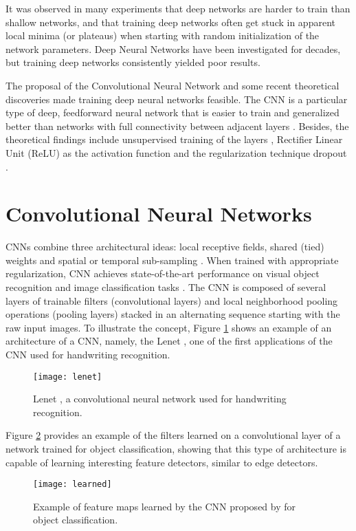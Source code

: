 It was observed in many experiments that deep networks are harder to train than shallow networks, and that training deep networks often get stuck in apparent local minima (or plateaus) when starting with random initialization of the network parameters. Deep Neural Networks have been investigated for decades, but training deep networks consistently yielded poor results. 

The proposal of the Convolutional Neural Network \cite{lecun1995convolutional} and some recent theoretical discoveries made training deep neural networks feasible. The CNN is a particular type of deep, feedforward neural network that is easier to train and generalized better than networks with full connectivity between adjacent layers \cite{lecun2015deep}. Besides, the theoretical findings include unsupervised training of the layers \cite{hinton2006fast}, Rectifier Linear Unit (ReLU) \cite{nair2010rectified} as the activation function and the regularization technique dropout \cite{srivastava2014dropout}. 


\section{Convolutional Neural Networks}
CNNs combine three architectural ideas: local receptive fields, shared
(tied) weights and spatial or temporal sub-sampling \cite{lecun1998gradient}. When trained with appropriate regularization, CNN achieves state-of-the-art performance
on visual object recognition and image classification tasks \cite{lecun2015deep}. The CNN is composed of several layers of trainable filters (convolutional layers) and local neighborhood pooling operations (pooling layers) stacked in an alternating sequence starting with the raw input images. To illustrate the concept, Figure \ref{lenet} shows an example of an architecture of a CNN, namely, the Lenet \cite{lecun1998gradient}, one of the first applications of the CNN used for handwriting recognition.

\begin{figure}[!htb]
\centering
\texttt{[image: lenet]}
\caption{Lenet \cite{lecun1998gradient}, a convolutional neural network used for handwriting recognition.}
\label{lenet}
\end{figure}

Figure \ref{learned} provides an example of the filters learned on a convolutional layer of a network trained for object classification, showing that this type of architecture is
capable of learning interesting feature detectors, similar to edge detectors.
\begin{figure}[!htb]
\centering
\texttt{[image: learned]}
\caption{Example of feature maps learned by the CNN proposed by \cite{krizhevsky2012imagenet} for object classification.}
\label{learned}
\end{figure}


